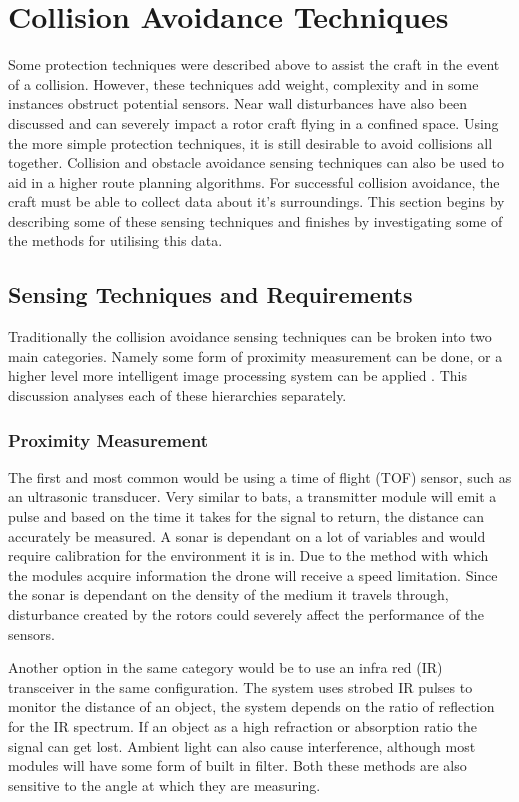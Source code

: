 \section{Collision Avoidance Techniques}
Some protection techniques were described above to assist the craft in the event of a collision. However, these techniques add weight, complexity and in some instances obstruct potential sensors. Near wall disturbances have also been discussed and can severely impact a rotor craft flying in a confined space. Using the more simple protection techniques, it is still desirable to avoid collisions all together. Collision and obstacle avoidance sensing techniques can also be used to aid in a higher route planning algorithms. For successful collision avoidance, the craft must be able to collect data about it's surroundings. This section begins by describing some of these sensing techniques and finishes by investigating some of the methods for utilising this data.

	\subsection{Sensing Techniques and Requirements}
	Traditionally the collision avoidance sensing techniques can be broken into two main categories. Namely some form of proximity measurement can be done, or a higher level more intelligent image processing system can be applied \cite{Green2015}. This discussion analyses each of these hierarchies separately.
	
		\subsubsection{Proximity Measurement}		
		The first and most common would be using a time of flight (TOF) sensor, such as an ultrasonic transducer. Very similar to bats, a transmitter module will emit a pulse and based on the time it takes for the signal to return, the distance can accurately be measured. A sonar is dependant on a lot of variables and would require calibration for the environment it is in. Due to the method with which the modules acquire information the drone will receive a speed limitation. Since the sonar is dependant on the density of the medium it travels through, disturbance created by the rotors could severely affect the performance of the sensors.
		
		Another option in the same category would be to use an infra red (IR) transceiver in the same configuration. The system uses strobed IR pulses to monitor the distance of an object, the system depends on the ratio of reflection for the IR spectrum. If an object as a high refraction or absorption ratio the signal can get lost. Ambient light can also cause interference, although most modules will have some form of built in filter. Both these methods are also sensitive to the angle at which they are measuring. 
		
